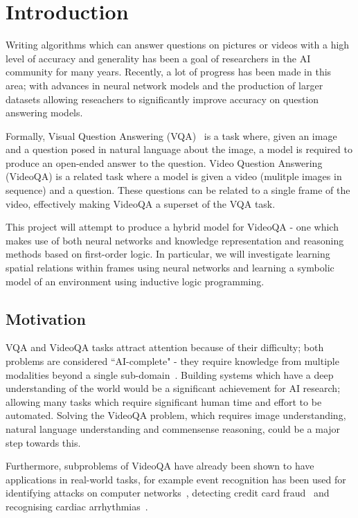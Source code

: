 \documentclass[../interim.tex]{subfiles}
\begin{document}
\chapter{Introduction}
\label{chapter:intro}

Writing algorithms which can answer questions on pictures or videos with a high level of accuracy and generality has been a goal of researchers in the AI community for many years. Recently, a lot of progress has been made in this area; with advances in neural network models and the production of larger datasets allowing reseachers to significantly improve accuracy on question answering models.

Formally, Visual Question Answering (VQA)~\cite{vqa-intro} is a task where, given an image and a question posed in natural language about the image, a model is required to produce an open-ended answer to the question. Video Question Answering (VideoQA) is a related task where a model is given a video (mulitple images in sequence) and a question. These questions can be related to a single frame of the video, effectively making VideoQA a superset of the VQA task.

This project will attempt to produce a hybrid model for VideoQA - one which makes use of both neural networks and knowledge representation and reasoning methods based on first-order logic. In particular, we will investigate learning spatial relations within frames using neural networks and learning a symbolic model of an environment using inductive logic programming.


\section{Motivation}

VQA and VideoQA tasks attract attention because of their difficulty; both problems are considered ``AI-complete" - they require knowledge from multiple modalities beyond a single sub-domain~\cite{def:ai-complete}. Building systems which have a deep understanding of the world would be a significant achievement for AI research; allowing many tasks which require significant human time and effort to be automated. Solving the VideoQA problem, which requires image understanding, natural language understanding and commensense reasoning, could be a major step towards this.

Furthermore, subproblems of VideoQA have already been shown to have applications in real-world tasks, for example event recognition has been used for identifying attacks on computer networks~\cite{ED-uses:networks}, detecting credit card fraud~\cite{ED-uses:fraud} and recognising cardiac arrhythmias~\cite{ED-uses:cardiac}.
\end{document}

